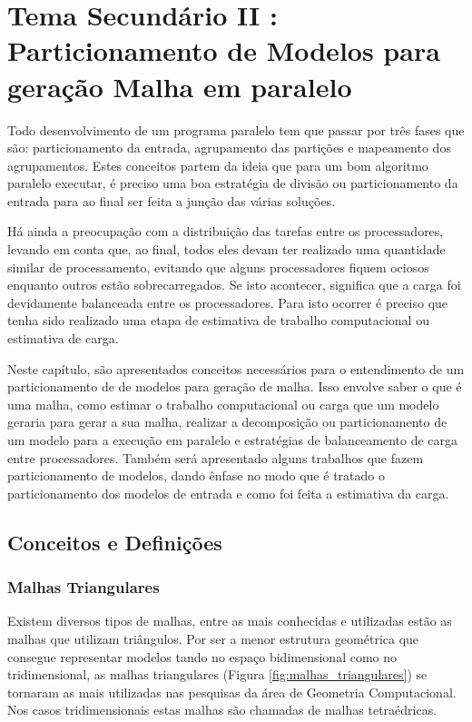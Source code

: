 \chapter{Tema Secundário II : Particionamento de Modelos para geração Malha em paralelo}\label{tema2}


Todo desenvolvimento de um programa paralelo tem que passar por três fases que são: particionamento da entrada, agrupamento das partições e mapeamento dos agrupamentos. Estes conceitos partem da ideia que para um bom algoritmo paralelo executar, é preciso uma boa estratégia de divisão ou particionamento da entrada para ao final ser feita a junção das várias soluções.

Há ainda a preocupação com a distribuição das tarefas entre os processadores, levando em conta que, ao final, todos eles devam ter realizado uma quantidade similar de processamento, evitando que alguns processadores fiquem ociosos enquanto outros estão sobrecarregados. Se isto acontecer, significa que a carga foi devidamente balanceada entre os processadores. Para isto ocorrer é preciso que tenha sido realizado uma etapa de estimativa de trabalho computacional ou estimativa de carga.

Neste capítulo, são apresentados conceitos necessários para o entendimento de um particionamento de de modelos para geração de malha. Isso envolve saber o que é uma malha, como estimar o trabalho computacional ou carga que um modelo geraria para gerar a sua malha, realizar a decomposição ou particionamento de um modelo para a execução em paralelo e estratégias de balanceamento de carga entre processadores. Também será apresentado alguns trabalhos que fazem particionamento de modelos, dando ênfase no modo que é tratado o particionamento dos modelos de entrada e como foi feita a estimativa da carga.


\section{Conceitos e Definições}\label{Geometria computacional}

\subsection{Malhas Triangulares}

Existem diversos tipos de malhas, entre as mais conhecidas e utilizadas estão as malhas que utilizam triângulos. Por ser a menor estrutura geométrica que consegue representar modelos tando no espaço bidimensional como no tridimensional, as  malhas triangulares (Figura \ref{fig:malhas_triangulares}) se tornaram as mais utilizadas nas pesquisas da área de Geometria Computacional. Nos casos tridimensionais estas malhas são chamadas de malhas tetraédricas.

